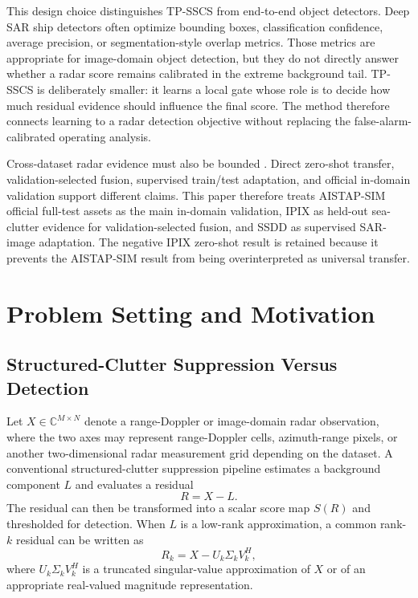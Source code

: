 \documentclass[journal]{IEEEtran}
\begin{document}
This design choice distinguishes TP-SSCS from end-to-end object detectors. Deep SAR ship detectors often optimize bounding boxes, classification confidence, average precision, or segmentation-style overlap metrics. Those metrics are appropriate for image-domain object detection, but they do not directly answer whether a radar score remains calibrated in the extreme background tail. TP-SSCS is deliberately smaller: it learns a local gate whose role is to decide how much residual evidence should influence the final score. The method therefore connects learning to a radar detection objective without replacing the false-alarm-calibrated operating analysis.

Cross-dataset radar evidence must also be bounded \cite{tuia2016domain}. Direct zero-shot transfer, validation-selected fusion, supervised train/test adaptation, and official in-domain validation support different claims. This paper therefore treats AISTAP-SIM official full-test assets as the main in-domain validation, IPIX as held-out sea-clutter evidence for validation-selected fusion, and SSDD as supervised SAR-image adaptation. The negative IPIX zero-shot result is retained because it prevents the AISTAP-SIM result from being overinterpreted as universal transfer.

\section{Problem Setting and Motivation}

\subsection{Structured-Clutter Suppression Versus Detection}

Let $X \in \mathbb{C}^{M \times N}$ denote a range-Doppler or image-domain radar observation, where the two axes may represent range-Doppler cells, azimuth-range pixels, or another two-dimensional radar measurement grid depending on the dataset. A conventional structured-clutter suppression pipeline estimates a background component $L$ and evaluates a residual
\begin{equation}
    R = X - L .
\end{equation}
The residual can then be transformed into a scalar score map $S(R)$ and thresholded for detection. When $L$ is a low-rank approximation, a common rank-$k$ residual can be written as
\begin{equation}
    R_k = X - U_k \Sigma_k V_k^{H},
\end{equation}
where $U_k \Sigma_k V_k^{H}$ is a truncated singular-value approximation of $X$ or of an appropriate real-valued magnitude representation.
\end{document}
